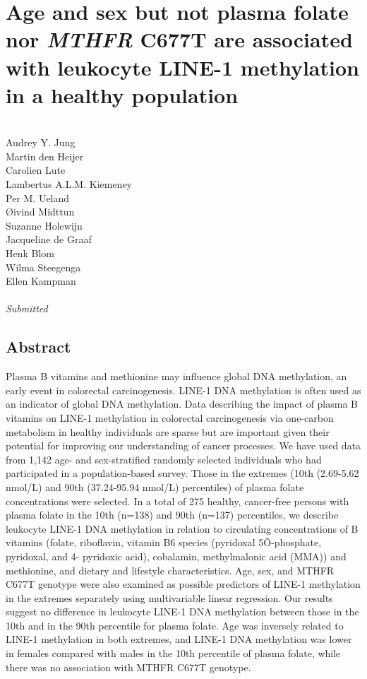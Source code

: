 \chapter[Healthy population]{Age and sex but not plasma folate nor \emph{MTHFR} C677T are associated with leukocyte LINE-1 methylation in a healthy population} 
\label{chap3_nbs} 

\quad\\

\noindent
Audrey Y. Jung\\
Martin den Heijer\\
Carolien Lute\\
Lambertus A.L.M. Kiemeney\\
Per M. Ueland\\
{\O}ivind Midttun\\
Suzanne Holewijn\\
Jacqueline de Graaf\\
Henk Blom\\
Wilma Steegenga\\
Ellen Kampman\\

\quad\\


\emph{Submitted}\\


\newpage

\section*{Abstract}

Plasma B vitamins and methionine may influence global DNA methylation, an early event in colorectal carcinogenesis. LINE-1 DNA methylation is often used as an indicator of global DNA methylation. Data describing the impact of plasma B vitamins on LINE-1 methylation in colorectal carcinogenesis via one-carbon metabolism in healthy individuals are sparse but are important given their potential for improving our understanding of cancer processes. We have used data from 1,142 age- and sex-stratified randomly selected individuals who had participated in a population-based survey. Those in the extremes (10th (2.69-5.62 nmol/L) and 90th (37.24-95.94 nmol/L) percentiles) of plasma folate concentrations were selected. In a total of 275 healthy, cancer-free persons with plasma folate in the 10th (n=138) and 90th (n=137) percentiles, we describe leukocyte LINE-1 DNA methylation in relation to circulating concentrations of B vitamins (folate, riboflavin, vitamin B6 species (pyridoxal 5Õ-phosphate, pyridoxal, and 4-
pyridoxic acid), cobalamin, methylmalonic acid (MMA)) and methionine, and dietary and lifestyle characteristics. Age, sex, and MTHFR C677T genotype were also examined as possible predictors of LINE-1 methylation in the extremes separately using multivariable linear regression. Our results suggest no difference in leukocyte LINE-1 DNA methylation between those in the 10th and in the 90th percentile for plasma folate. Age was inversely related to LINE-1 methylation in both extremes, and LINE-1 DNA methylation was lower in females compared with males in the 10th percentile of plasma folate, while there was no association with MTHFR C677T genotype.

